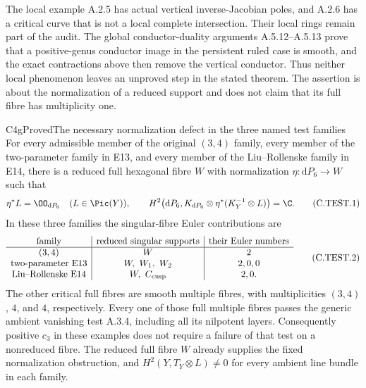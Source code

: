 The local example A.2.5 has actual vertical inverse-Jacobian
poles, and A.2.6 has a critical curve that is not a local
complete intersection. Their local rings remain part of the
audit. The global conductor-duality arguments A.5.12--A.5.13 prove
that a positive-genus conductor image in the persistent ruled
case is smooth, and the exact contractions above then remove
the vertical conductor. Thus neither local phenomenon leaves
an unproved step in the stated theorem. The assertion
is about the normalization of a reduced support and does not
claim that its full fibre has multiplicity one.



\begin{statement}{C4g}{Proved}{The necessary normalization defect in the three named test families}
For every admissible member of the original $(3,4)$ family,
every member of the two-parameter family in E13, and every
member of the Liu--Rollenske family in E14, there is a reduced
full hexagonal fibre $W$ with normalization
$\eta:\mathrm dP_6\to W$ such that
\[
 \eta^*L=\OO_{\mathrm dP_6}\quad(L\in\Pic(Y)),\qquad
 H^2\bigl(\mathrm dP_6,K_{\mathrm dP_6}\otimes
                    \eta^*(K_Y^{-1}\otimes L)\bigr)=\C.
 \tag{C.TEST.1}
\]
In these three families the singular-fibre Euler contributions are
\[
\begin{array}{c|c|c}
\text{family}&\text{reduced singular supports}&
                 \text{their Euler numbers}\\ \hline
(3,4)&W&2\\
\text{two-parameter E13}&W,\ W_1,\ W_2&2,0,0\\
\text{Liu--Rollenske E14}&W,\ C_{\rm cusp}&2,0 .
\end{array}
\tag{C.TEST.2}
\]
The other critical full fibres are smooth multiple fibres,
with multiplicities $(3,4)$, $4$, and $4$, respectively.
Every one of those full multiple fibres passes the generic
ambient vanishing test A.3.4, including all its nilpotent
layers. Consequently positive $c_3$ in these examples does
not require a failure of that test on a nonreduced fibre.
The reduced full fibre $W$ already supplies the fixed
normalization obstruction, and $H^2(Y,T_Y\otimes L)\ne0$
for every ambient line bundle in each family.
\end{statement}
